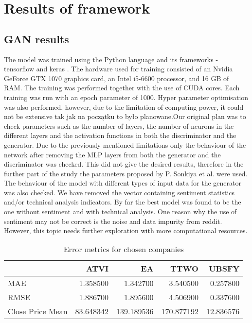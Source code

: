 \documentclass[11pt]{article} %
\begin{document}
\section{Results of framework}

\subsection{GAN results}

The model was trained using the Python language and its frameworks - tensorflow \cite{tensorflow}  and keras \cite{keras}\cite{keras-2}. The hardware used for training consisted of an Nvidia GeForce GTX 1070 graphics card, an Intel i5-6600 processor, and 16 GB of RAM. The training was performed together with the use of CUDA cores. Each training was run with an epoch parameter of 1000. Hyper parameter optimisation was also performed,  however, due to the limitation of computing power, it could not be extensive tak jak na początku to było planowane.Our original plan was to check parameters such as the number of layers, the number of neurons in the different layers and the activation functions in both the discriminator and the generator. Due to the previously mentioned limitations only the behaviour of the network after removing the MLP layers from both the generator and the discriminator was checked. This did not give the desired results, therefore in the further part of the study the parameters proposed by P. Sonkiya et al. were used. The behaviour of the model with different types of input data for the generator was also checked. We have removed  the vector containing sentiment statistics and/or technical analysis indicators. By far the best model was found to be the one without sentiment and with technical analysis. One reason why the use of sentiment may not be correct is the noise and data impurity from reddit. However, this topic needs further exploration with more computational resources. 

\begin{table}[H]
\centering
\caption{Error metrics for chosen companies}
\begin{tabular}{lrrrr}
\toprule
{} &       ATVI &          EA &        TTWO &      UBSFY \\
\midrule
MAE              &   1.358500 &    1.342700 &    3.540500 &   0.257800 \\
RMSE             &   1.886700 &    1.895600 &    4.506900 &   0.337600 \\
Close Price Mean &  83.648342 &  139.189536 &  170.877192 &  12.836576 \\
\bottomrule
\end{tabular}
\end{table}
\end{document}
